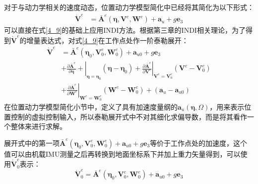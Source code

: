 对于与动力学相关的速度动态，位置动力学模型简化中已经将其简化为以下形式：
\begin{equation}
    \begin{aligned}
        \dot{\boldsymbol{V}}^e&=
        \bar{\boldsymbol{A}}^e(\boldsymbol{\eta},\boldsymbol{V}^e,\boldsymbol{W}^e)+\boldsymbol{a}_u+g\boldsymbol{e}_3
    \end{aligned}
    \label{4_9}
\end{equation}
可以直接在式\eqref{4_9}的基础上应用INDI方法。根据第三章的INDI相关理论，为了得到$\boldsymbol{\dot{V}}^e$的增量表达式，对式\eqref{4_9}在工作点处作一阶泰勒展开：
\begin{equation}
    \begin{aligned}
        \boldsymbol{\dot{V}}^e&=\bar{\boldsymbol{A}}^e(\boldsymbol{\eta}_0,\boldsymbol{V}^e_0,\boldsymbol{W}^e_0)+\boldsymbol{a}_{u0}+g\boldsymbol{e}_3\\
        &+\left.\frac{\partial \bar{\boldsymbol{A}}^e}{\partial\boldsymbol{\eta}}+\right|_{\boldsymbol{\eta}=\boldsymbol{\eta}_0}
        (\boldsymbol{\eta}-\boldsymbol{\eta}_0)+\left.\frac{\partial \bar{\boldsymbol{A}}^e}{\partial\boldsymbol{V}^e}\right|_{\boldsymbol{V}^e=\boldsymbol{V}^e_0}
        (\boldsymbol{V}^e-\boldsymbol{V}^e_0)\\
        &+\left.\frac{\partial \bar{\boldsymbol{A}}^e}{\partial\boldsymbol{W}^e}\right|_{\boldsymbol{W}^e=\boldsymbol{W}^e_0}(\boldsymbol{W}^e-\boldsymbol{W}^e_0)+(\boldsymbol{a}_{u}-\boldsymbol{a}_{u0})
    \end{aligned}
    \label{4_10}
\end{equation}
在位置动力学模型简化小节中，定义了具有加速度量纲的$\boldsymbol{a}_u(\boldsymbol{\eta},\Omega)$，用来表示位置控制的虚拟控制输入，所以泰勒展开式中不对其细化求偏导数，而是将其看作一个整体来进行求解。

展开式中的第一项$\bar{\boldsymbol{A}}^e(\boldsymbol{\eta}_0,\boldsymbol{V}^e_0,\boldsymbol{W}^e_0)+\boldsymbol{a}_{u0}+g\boldsymbol{e}_3$等价于工作点处的加速度，这个值可以由机载IMU测量之后再转换到地面坐标系下并加上重力矢量得到，可以使用$\dot{\boldsymbol{V}}^e_0$表示：
\begin{equation}
        \dot{\boldsymbol{V}}^e_0=\bar{\boldsymbol{A}}^e(\boldsymbol{\eta}_0,\boldsymbol{V}^e_0,\boldsymbol{W}^e_0)+\boldsymbol{a}_{u0}+g\boldsymbol{e}_3
    \label{4_11}
\end{equation}

